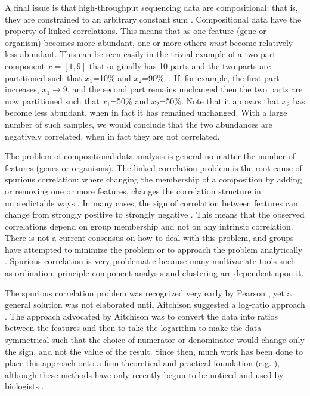\documentclass[10pt,letterpaper]{article}
\begin{document}
A final issue is that high-throughput sequencing data are compositional: that is, they are constrained to an arbitrary constant sum \cite{Friedman:2012, fernandes:2013, Lovell:2015}. Compositional data have the property of linked correlations. This means that as one feature (gene or organism) becomes more abundant, one or more others \emph{must} become relatively less abundant. This can be seen easily in the trivial example of a two part component $x=[1,9]$ that originally has 10 parts and the two parts are partitioned such that $x_1$=10\% and $x_2$=90\%. . If, for example, the first part increases, $x_1 \to 9$,  and the second part remains unchanged then the two parts are now partitioned such that   $x_1$=50\% and $x_2$=50\%. Note that it appears that $x_2$ has become less abundant, when in fact it has remained unchanged. With a large number of such samples, we would conclude that the two abundances are negatively correlated, when in fact they are not correlated.

The problem of compositional data analysis is general no matter the number of features (genes or organisms). The linked correlation problem is the root cause of spurious correlation: where changing the membership of a composition by adding or removing one or more features, changes the correlation structure in unpredictable ways \cite{Aitchison:1986}. In many cases, the sign of  correlation between  features can change from strongly positive to strongly negative \cite{Friedman:2012, Lovell:2015}. This means that the observed correlations depend on group membership and not on any intrinsic correlation. There is not a current consensus on how to deal with this problem, and  groups have attempted to minimize the problem \cite{Friedman:2012, Kurtz:2015} or to approach the problem analytically \cite{Lovell:2015}.  Spurious correlation is very problematic because many multivariate tools such as ordination, principle component analysis and clustering are dependent upon it. 

The spurious correlation problem was recognized very early by Pearson \cite{Pearson:1896}, yet a general solution was not elaborated until Aitchison suggested a log-ratio approach \cite{Aitchison:1986}. The approach advocated by Aitchison was to convert the data into ratios between the features and then to take the logarithm to make the data symmetrical such that the choice of numerator or denominator would change only the sign, and not the  value of the result. Since then, much work has been done to place this approach onto a firm theoretical and practical foundation (e.g. \cite{pawlowsky2015modeling,MPE2011,Egozcue:2003,martin:2003}), although these methods have only recently begun to be noticed and used by biologists  \cite{Friedman:2012, fernandes:2013, macklaim:2013, ancom:2015, Lovell:2015, Kurtz:2015}. 
\end{document}
